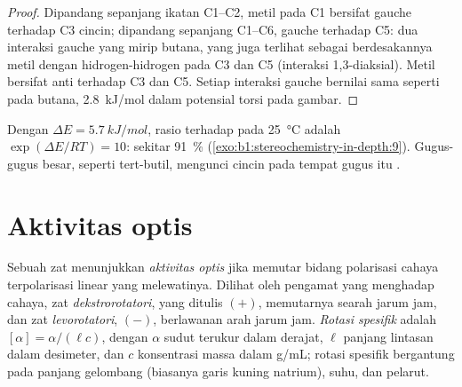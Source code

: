 \begin{proof}
Dipandang sepanjang ikatan C1--C2, metil  pada C1 bersifat gauche
terhadap C3 cincin; dipandang sepanjang C1--C6, gauche terhadap C5: dua
interaksi gauche yang mirip butana, yang juga terlihat sebagai
berdesakannya metil dengan hidrogen-hidrogen  pada C3 dan C5
(interaksi 1,3-diaksial). Metil  bersifat anti terhadap C3 dan
C5. Setiap interaksi gauche bernilai sama seperti pada butana,
\qty{2.8}{kJ/mol} dalam potensial torsi pada gambar.
\end{proof}

Dengan $\Delta E = \qty{5.7}{kJ/mol}$, rasio   terhadap
  pada \qty{25}{\celsius} adalah $\exp(\Delta E/RT) = 10$:
sekitar \qty{91}{\percent} 
(\cref{exo:b1:stereochemistry-in-depth:9}). Gugus-gugus besar, seperti
tert-butil, mengunci cincin pada  tempat gugus itu .

\section{Aktivitas optis}

\begin{definition}\label{def:b1:stereochemistry-in-depth:optical-activity}
Sebuah zat menunjukkan \emph{aktivitas optis} jika
memutar bidang polarisasi cahaya terpolarisasi linear yang melewatinya.
Dilihat oleh pengamat yang menghadap cahaya, zat
\emph{dekstrorotatori}, yang ditulis $(+)$,
memutarnya searah jarum jam, dan zat
\emph{levorotatori}, $(-)$, berlawanan arah jarum
jam. \emph{Rotasi spesifik} adalah
$[\alpha] = \alpha/(\ell c)$, dengan $\alpha$ sudut terukur dalam
derajat, $\ell$ panjang lintasan dalam desimeter, dan $c$ konsentrasi
massa dalam \unit{g/mL}; rotasi spesifik bergantung pada panjang
gelombang (biasanya garis kuning natrium), suhu, dan pelarut.
\end{definition}

